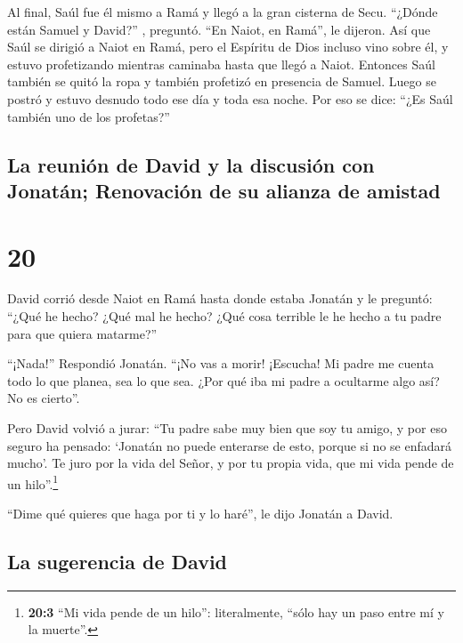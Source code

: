  Al final, Saúl fue él mismo a Ramá y llegó a la gran
cisterna de Secu. ``¿Dónde están Samuel y David?'' , preguntó. ``En
Naiot, en Ramá'', le dijeron. Así que Saúl se dirigió a Naiot en Ramá,
pero el Espíritu de Dios incluso vino sobre él, y estuvo profetizando
mientras caminaba hasta que llegó a Naiot.  Entonces Saúl
también se quitó la ropa y también profetizó en presencia de Samuel.
Luego se postró y estuvo desnudo todo ese día y toda esa noche. Por eso
se dice: ``¿Es Saúl también uno de los profetas?''

\hypertarget{la-reuniuxf3n-de-david-y-la-discusiuxf3n-con-jonatuxe1n-renovaciuxf3n-de-su-alianza-de-amistad}{%
\subsection{La reunión de David y la discusión con Jonatán; Renovación
de su alianza de
amistad}\label{la-reuniuxf3n-de-david-y-la-discusiuxf3n-con-jonatuxe1n-renovaciuxf3n-de-su-alianza-de-amistad}}

\hypertarget{section-19}{%
\section{20}\label{section-19}}

 David corrió desde Naiot en Ramá hasta donde estaba
Jonatán y le preguntó: ``¿Qué he hecho? ¿Qué mal he hecho? ¿Qué cosa
terrible le he hecho a tu padre para que quiera matarme?''

 ``¡Nada!'' Respondió Jonatán. ``¡No vas a morir!
¡Escucha! Mi padre me cuenta todo lo que planea, sea lo que sea. ¿Por
qué iba mi padre a ocultarme algo así? No es cierto''.

 Pero David volvió a jurar: ``Tu padre sabe muy bien que
soy tu amigo, y por eso seguro ha pensado: `Jonatán no puede enterarse
de esto, porque si no se enfadará mucho'. Te juro por la vida del Señor,
y por tu propia vida, que mi vida pende de un hilo''.\footnote{\textbf{20:3}
  ``Mi vida pende de un hilo'': literalmente, ``sólo hay un paso entre
  mí y la muerte''.}

 ``Dime qué quieres que haga por ti y lo haré'', le dijo
Jonatán a David.

\hypertarget{la-sugerencia-de-david}{%
\subsection{La sugerencia de David}\label{la-sugerencia-de-david}}

